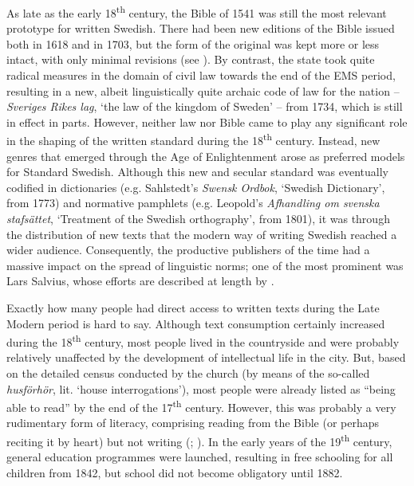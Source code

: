 \documentclass[output=paper]{langscibook}
\begin{document}
As late as the early 18\textsuperscript{th} century, the Bible of 1541 was still the most relevant prototype for written Swedish. There had been new editions of the Bible issued both in 1618 and in 1703, but the form of the original was kept more or less intact, with only minimal revisions (see \citealt{Platzack2005}). By contrast, the state took quite radical measures in the domain of civil law towards the end of the EMS period, resulting in a new, albeit linguistically quite archaic \citep{Wessen1965} code of law for the nation – \textit{Sveriges Rikes lag}, ‘the law of the kingdom of Sweden’ – from 1734, which is still in effect in parts. However, neither law nor Bible came to play any significant role in the shaping of the written standard during the 18\textsuperscript{th} century. Instead, new genres that emerged through the Age of Enlightenment arose as preferred models for Standard Swedish. Although this new and secular standard was eventually codified in dictionaries (e.g. Sahlstedt’s \textit{Swensk Ordbok}, ‘Swedish Dictionary’, from 1773) and normative pamphlets (e.g. Leopold’s \textit{Afhandling om svenska stafsättet}, ‘Treatment of the Swedish orthography’, from 1801), it was through the distribution of new texts that the modern way of writing Swedish reached a wider audience. Consequently, the productive publishers of the time had a massive impact on the spread of linguistic norms; one of the most prominent was Lars Salvius, whose efforts are described at length by \citet{Santesson1986}.



Exactly how many people had direct access to written texts during the Late Modern period is hard to say. Although text consumption certainly increased during the 18\textsuperscript{th} century, most people lived in the countryside and were probably relatively unaffected by the development of intellectual life in the city. But, based on the detailed census conducted by the church (by means of the so-called \textit{husförhör}, lit. ‘house interrogations’), most people were already listed as “being able to read” by the end of the 17\textsuperscript{th} century. However, this was probably a very rudimentary form of literacy, comprising reading from the Bible (or perhaps reciting it by heart) but not writing (\citealt{Johansson1981}; \citealt{Berg1994}). In the early years of the 19\textsuperscript{th} century, general education programmes were launched, resulting in free schooling for all children from 1842, but school did not become obligatory until 1882.
\end{document}
